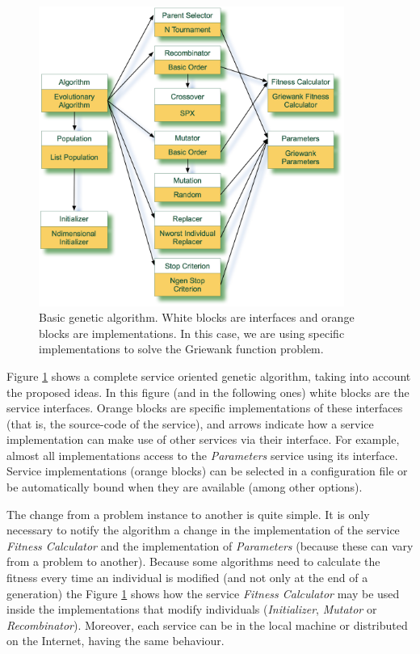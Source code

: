 \begin{figure}
\centering
\includegraphics[width=10cm]{gfx/soaea/basicga.jpg}
\caption{Basic genetic algorithm. White blocks are interfaces and orange blocks are implementations. In this case, we are using specific implementations to solve the Griewank function problem.}
\label{BASICGAEXAMPLE}
\end{figure}





Figure \ref{BASICGAEXAMPLE} shows a complete service oriented genetic algorithm, taking into account the proposed ideas. In this figure (and in the following ones) white blocks are the service interfaces. Orange blocks are specific implementations of these interfaces (that is, the source-code of the service), and  arrows indicate how a service implementation can make use of other services via their interface. For example, almost all implementations access to the {\em Parameters} service using its interface. Service implementations (orange blocks) can be selected in a configuration file or be automatically bound when they are available (among other options).

 The change from a problem instance to another is quite simple. It is only necessary to notify the algorithm a change in the implementation of the service {\em Fitness Calculator} and the implementation of {\em Parameters} (because these can vary from a problem to another). Because some algorithms need to calculate the fitness every time an individual is modified (and not only at the end of a generation) the Figure \ref{BASICGAEXAMPLE} shows how the service {\em Fitness Calculator} may be used inside the implementations that modify individuals ({\em Initializer}, {\em Mutator} or {\em Recombinator}). Moreover, each service can be in the local machine or distributed on the Internet, having the same behaviour.

